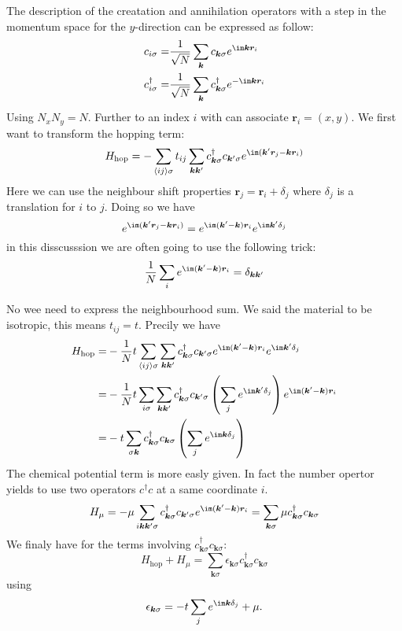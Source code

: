 \documentclass[../main.tex]{subfile}
\begin{document}
 The description of the creatation and annihilation operators with a step in the momentum space for the $y$-direction can be expressed as follow:
 \begin{align}
     c_{i\sigma} =& \frac{1}{\sqrt{N}} \sum_{\bm{k}} c_{\bm{k}\sigma} e^{\im \bm{k} \bm{r}_i} \label{eq:C_Foruier_2D}\\
     c^{\dagger}_{i\sigma} =& \frac{1}{\sqrt{N}} \sum_{\bm{k}} c^{\dagger}_{\bm{k}\sigma} e^{-\im \bm{k} \bm{r}_i}\label{eq:C_dagg_Foruier_2D}
 \end{align}
 Using $N_xN_y = N$. Further to an index $i$ with can associate $\bm{r}_i = (x,y)$.
 We first want to transform the hopping term:
 \begin{equation*}
     H_{\text{hop}} = -\sum_{\langle ij\rangle \sigma} t_{ij} \sum_{\bm{k}\bm{k}'} c^{\dagger}_{\bm{k}\sigma} c_{\bm{k}'\sigma} e^{\im (\bm{k}' \bm{r}_j - \bm{k} \bm{r}_i)}
 \end{equation*}
 Here we can use the neighbour shift properties $ \bm{r}_j =  \bm{r}_i + \delta_j$ where  $\delta_j$ is a translation for $i$ to $j$. Doing so we have 
 \[
     e^{\im (\bm{k}' \bm{r}_j - \bm{k} \bm{r}_i)} = e^{\im (\bm{k}'- \bm{k} )\bm{r}_i}e^{\im \bm{k}'\delta_j}
 \]
in this disscusssion we are often going to use the following trick:
\begin{equation}
    \frac{1}{N} \sum_{i} e^{\im (\bm{k}' -  \bm{k})\bm{r}_i} = \delta_{\bm{k}\bm{k}'}
\end{equation}

 No wee need to express the neighbourhood sum. We said the material to be isotropic, this means $t_{ij} = t$. Precily we have
 \begin{align*}
         H_{\text{hop}} =& -\frac{1}{N}t\sum_{\langle ij\rangle \sigma} \sum_{\bm{k}\bm{k}'} c^{\dagger}_{\bm{k}\sigma} c_{\bm{k}'\sigma}  e^{\im (\bm{k}'- \bm{k} )\bm{r}_i}e^{\im \bm{k}'\delta_j}\\
                         =& -\frac{1}{N}t\sum_{i \sigma} \sum_{\bm{k}\bm{k}'} c_{\bm{k}\sigma}^{\dagger} c_{\bm{k}'\sigma}\left(\sum_{j} e^{\im \bm{k}'\delta_j}\right)e^{\im (\bm{k}'- \bm{k} )\bm{r}_i}\\
                         =& -t\sum_{\sigma\bm{k}} c_{\bm{k}\sigma}^{\dagger} c_{\bm{k}\sigma}\left(\sum_{j} e^{\im \bm{k}\delta_j}\right)
    \end{align*}
The chemical potential term is more easly given. In fact the number opertor yields to use two operators $c^{\dagger}c$ at a same coordinate $i$.
 \begin{equation}
     H_{\mu} = -\mu \sum_{i\bm{k}\bm{k}' \sigma} c_{\bm{k}\sigma}^{\dagger} c_{\bm{k}'\sigma} e^{\im (\bm{k}'-\bm{k})\bm{r}_i} = \sum_{\bm{k}\sigma} \mu c_{\bm{k}\sigma}^{\dagger} c_{\bm{k}\sigma}     
 \end{equation}
 We finaly have for the terms involving $c^{\dagger}_{\bm{k}\sigma} c_{\bm{k}\sigma}$:
 \begin{equation*}
     H_{\text{hop}} + H_{\mu} = \sum_{\bm{k}\sigma} \epsilon_{\bm{k}\sigma} c_{\bm{k}\sigma}^{\dagger} c_{\bm{k}\sigma}
 \end{equation*}
 using
 \[
     \epsilon_{\bm{k}\sigma}= - t\sum_{j} e^{\im \bm{k}\delta_j} + \mu.
 \]
 
\end{document}
